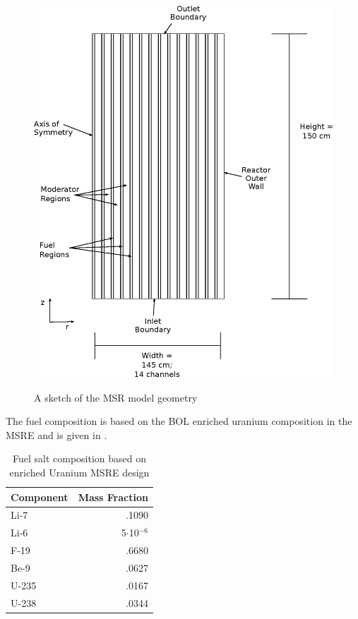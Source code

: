 \documentclass{article}
\begin{document}
\begin{figure}
  \centering
  \includegraphics{geometry.eps}
  \label{fig:geom}
  \caption{A sketch of the \gls{MSR} model geometry}
\end{figure}


The fuel composition is based on the \gls{BOL} enriched uranium composition in the \gls{MSRE}
and is given in  \cite{robertson_msre_1965}.


\begin{table}[htpb]
  \begin{center}
    \begin{tabular}{l | r}
      Component & Mass Fraction\\\hline\hline
      Li-7 & .1090\\
      Li-6 & 5$\cdot$10$^{-6}$\\
      F-19 & .6680\\
      Be-9 & .0627\\
      U-235 & .0167\\
      U-238 & .0344\\
    \end{tabular}
  \end{center}
  \caption{Fuel salt composition based on enriched Uranium \gls{MSRE} design \cite{robertson_msre_1965}}
  \label{table:comp}
\end{table}
\end{document}
